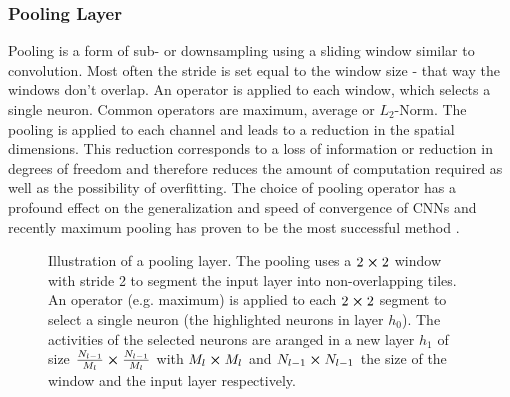\subsubsection{Pooling Layer}
Pooling is a form of sub- or downsampling using a sliding window similar to convolution. Most often the stride is set equal to the window size - that way the windows don't overlap. An operator is applied to each window, which selects a single neuron. Common operators are maximum, average or $L_2$-Norm. The pooling is applied to each channel and leads to a reduction in the spatial dimensions. This reduction corresponds to a loss of information or reduction in degrees of freedom and therefore reduces the amount of computation required as well as the possibility of overfitting. The choice of pooling operator has a profound effect on the generalization and speed of convergence of CNNs and recently maximum pooling has proven to be the most successful method \cite{pooling1,pooling2}.
\begin{figure}
    \centering
{}
\caption[Illustration of a pooling layer]{Illustration of a pooling layer. The pooling uses a $2\cp 2$ window with stride 2 to segment the input layer into non-overlapping tiles. An operator (e.g. maximum) is applied to each $2\cp 2$ segment to select a single neuron (the highlighted neurons in layer $h_0$). The activities of the selected neurons are aranged in a new layer $h_1$ of size $\frac{N_{l-1}}{M_l}\cp \frac{N_{l-1}}{M_l}$ with $M_{l}\cp M_{l}$ and $N_{l-1}\cp N_{l-1}$ the size of the window and the input layer respectively.}\label{fig:pooling}
\end{figure}\noindent
